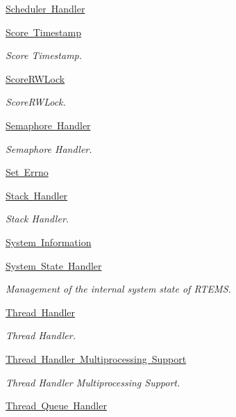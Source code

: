 \begin{DoxyCompactItemize}
\mbox{\hyperlink{group__RTEMSScoreScheduler}{Scheduler Handler}}
\item 
\mbox{\hyperlink{group__SuperCoreTimeStamp}{Score Timestamp}}
\begin{DoxyCompactList}\small\item\em Score Timestamp. \end{DoxyCompactList}\item 
\mbox{\hyperlink{group__RTEMSScoreRWLock}{Score\+R\+W\+Lock}}
\begin{DoxyCompactList}\small\item\em Score\+R\+W\+Lock. \end{DoxyCompactList}\item 
\mbox{\hyperlink{group__RTEMSScoreSemaphore}{Semaphore Handler}}
\begin{DoxyCompactList}\small\item\em Semaphore Handler. \end{DoxyCompactList}\item 
\mbox{\hyperlink{group__RTEMSScoreSetErr}{Set Errno}}
\item 
\mbox{\hyperlink{group__RTEMSScoreStack}{Stack Handler}}
\begin{DoxyCompactList}\small\item\em Stack Handler. \end{DoxyCompactList}\item 
\mbox{\hyperlink{group__RTEMSScoreSystem}{System Information}}
\item 
\mbox{\hyperlink{group__RTEMSScoreSysState}{System State Handler}}
\begin{DoxyCompactList}\small\item\em Management of the internal system state of R\+T\+E\+MS. \end{DoxyCompactList}\item 
\mbox{\hyperlink{group__RTEMSScoreThread}{Thread Handler}}
\begin{DoxyCompactList}\small\item\em Thread Handler. \end{DoxyCompactList}\item 
\mbox{\hyperlink{group__RTEMSScoreThreadMP}{Thread Handler Multiprocessing Support}}
\begin{DoxyCompactList}\small\item\em Thread Handler Multiprocessing Support. \end{DoxyCompactList}\item 
\mbox{\hyperlink{group__RTEMSScoreThreadQueue}{Thread Queue Handler}}

\end{DoxyCompactItemize}
